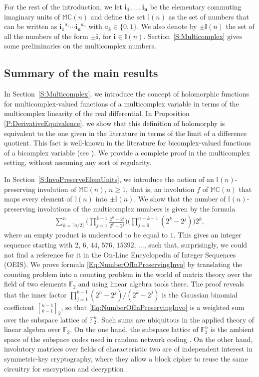 \documentclass[12pt]{amsart}
\theoremstyle{plain}
\theoremstyle{definition}
\numberwithin{equation}{section}
\newcommand{\im}[1]{\mathbf{ i_{#1}}}
\newcommand{\mC}{\mathbb{C}}
\newcommand{\mM}{\mathbb{M}}
\newcommand{\mI}{\mathbb{I}}
\begin{document}
For the rest of the introduction, we let $\im{1}, \ldots, \im{n}$ be the elementary commuting imaginary units of $\mM \mC(n)$ and define the set $\mI(n)$ as the set of numbers that can be written as $\im{1}^{a_1}\cdots \im{n}^{a_n}$ with $a_k\in \{0,1\}$. We also denote by $\pm \mI(n)$ the set of all the numbers of the form $\pm \im{}$, for $\im{} \in \mI(n)$. Section~\ref{S:Multicomplex} gives some preliminaries on the multicomplex numbers. 

\subsection{Summary of the main results}
In Section~\ref{S:Multicomplex}, we introduce the concept of holomorphic functions for multicomplex-valued functions of a multicomplex variable in terms of the multicomplex linearity of the real differential. In Proposition \ref{P:DerivativeEquivalence}, we show that this definition of holomorphy is equivalent to the one given in the literature in terms of the limit of a difference quotient. This fact is well-known in the literature for bicomplex-valued functions of a bicomplex variable (see \cite[Remark 7.3.4]{Bicomplex}). We provide a complete proof in the multicomplex setting, without assuming any sort of regularity. 

In Section~\ref{S:InvoPreserveElemUnits}, we introduce the notion of an $\mI(n)$-preserving involution of $\mM \mC(n)$, $n \geq 1$, that is, an involution $f$ of $\mM \mC(n)$ that maps every element of $\mI(n)$ into $\pm\mI(n)$. We show that the number of $\mI(n)$-preserving involutions of the multicomplex numbers is given by the formula
    \begin{align}
        \sum_{k=\lceil n/2\rceil}^{n}  \Big( \prod_{j = 1}^{k-1} \frac{2^n - 2^j}{2^k - 2^j} \Big) \Big( \prod_{j = 0}^{n-k-1} (2^k - 2^j) \Big) 2^k , \label{Eq:NumberOfInPreservingInvo}
    \end{align}
where an empty product is understood to be equal to $1$. This gives an integer sequence starting with $2$, $6$, $44$, $576$, $15392$, $\ldots$, such that, surprisingly, we could not find a reference for it in the On-Line Encyclopedia of Integer Sequences (OEIS). 
We prove formula \eqref{Eq:NumberOfInPreservingInvo} by translating the counting problem into a counting problem in the world of matrix theory over the field of two elements $\mathbb{F}_2$ and using linear algebra tools there. 
The proof reveals that the inner factor $\prod_{j=1}^{k-1}(2^n-2^j)/(2^k-2^j)$ is the Gaussian binomial coefficient $\genfrac{[}{]}{0pt}{}{n-1}{k-1}_2$, so that \eqref{Eq:NumberOfInPreservingInvo} is a weighted sum over the subspace lattice of $\mathbb{F}_2^{n}$. 
Such sums are ubiquitous in the applied theory of linear algebra over $\mathbb{F}_2$. 
On the one hand, the subspace lattice of $\mathbb{F}_2^n$ is the ambient space of the subspace codes used in random network coding \cite{KoetterKschischang2008}. On the other hand, involutory matrices over fields of characteristic two are of independent interest in symmetric-key cryptography, where they allow a block cipher to reuse the same circuitry for encryption and decryption \cite{GuptaPandeyRaySamanta2019}. 
\end{document}
